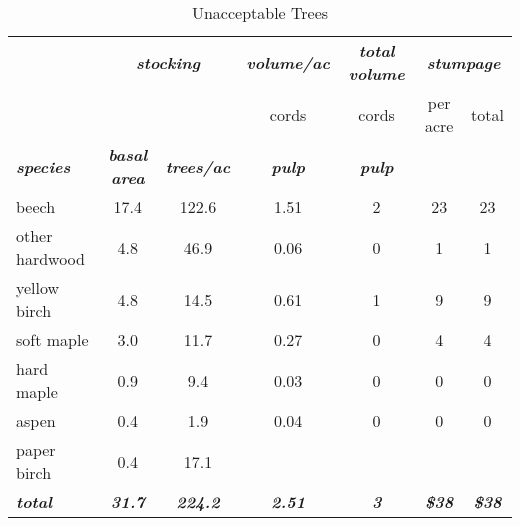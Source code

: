 \documentclass[landscape]{article}
\begin{document}
\begin{table}[H]

\caption{\label{tab:unnamed-chunk-43}Unacceptable Trees}
\fontsize{10}{12}\selectfont
\begin{tabular}[t]{lcccccc}
\toprule
\multicolumn{1}{c}{\em{\textbf{ }}} & \multicolumn{2}{c}{\em{\textbf{stocking}}} & \multicolumn{1}{c}{\em{\textbf{volume/ac }}} & \multicolumn{1}{c}{\em{\textbf{total volume}}} & \multicolumn{2}{c}{\em{\textbf{stumpage}}} \\
\cmidrule(l{3pt}r{3pt}){2-3} \cmidrule(l{3pt}r{3pt}){4-4} \cmidrule(l{3pt}r{3pt}){5-5} \cmidrule(l{3pt}r{3pt}){6-7}
\multicolumn{3}{c}{ } & \multicolumn{1}{c}{cords} & \multicolumn{1}{c}{cords} & \multicolumn{1}{c}{per acre} & \multicolumn{1}{c}{total} \\
\cmidrule(l{3pt}r{3pt}){4-4} \cmidrule(l{3pt}r{3pt}){5-5} \cmidrule(l{3pt}r{3pt}){6-6} \cmidrule(l{3pt}r{3pt}){7-7}
\rowcolor[HTML]{DCDCDC}  \em{\textbf{species}} & \em{\textbf{basal area}} & \em{\textbf{trees/ac}} & \em{\textbf{pulp}} & \em{\textbf{pulp}} & \em{\textbf{ }} & \em{\textbf{ }}\\
\midrule
\rowcolor{gray!6}  beech & 17.4 & 122.6 & 1.51 & 2 & 23 & 23\\
 
other hardwood & 4.8 & 46.9 & 0.06 & 0 & 1 & 1\\
 
\rowcolor{gray!6}  yellow birch & 4.8 & 14.5 & 0.61 & 1 & 9 & 9\\
 
soft maple & 3.0 & 11.7 & 0.27 & 0 & 4 & 4\\
 
\rowcolor{gray!6}  hard maple & 0.9 & 9.4 & 0.03 & 0 & 0 & 0\\
 
aspen & 0.4 & 1.9 & 0.04 & 0 & 0 & 0\\
 
\rowcolor{gray!6}  paper birch & 0.4 & 17.1 &  &  &  & \\
 
\rowcolor[HTML]{DCDCDC}  \em{\textbf{total}} & \em{\textbf{31.7}} & \em{\textbf{224.2}} & \em{\textbf{2.51}} & \em{\textbf{3}} & \em{\textbf{\$38}} & \em{\textbf{\$38}}\\
\bottomrule
\end{tabular}
\end{table}
\end{document}

